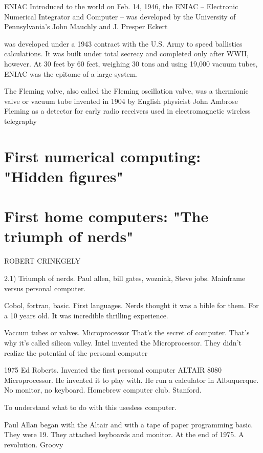   ENIAC Introduced to the world on Feb. 14, 1946, the ENIAC -- Electronic Numerical Integrator and Computer -- was developed by the 
  University 
  of Pennsylvania's John Mauchly and J. Presper Eckert 
  
  was developed under a 1943 contract with the U.S. Army to speed ballistics calculations. It was built under total secrecy and completed 
  only 
  after WWII, however. At 30 feet by 60 feet, weighing 30 tons and using 19,000 vacuum tubes, ENIAC was the epitome of a large system.
  
  The Fleming valve, also called the Fleming oscillation valve, was a thermionic valve or vacuum tube invented in 1904 by English physicist 
  John Ambrose Fleming as a detector for early radio receivers used in electromagnetic wireless telegraphy
  
  \section{First numerical computing: "Hidden figures"}
 
 
  \section{First home computers: "The triumph of nerds"}
  ROBERT CRINKGELY
  
  2.1) Triumph of nerds. Paul allen, bill gates, wozniak, Steve jobs. 
  Mainframe versus personal computer. 
  
  Cobol, fortran, basic. First languages. 
  Nerds thought it was a bible for them. For a 10 years old. It was incredible thrilling experience. 
  
  Vaccum tubes or valves. Microprocessor That's the secret of computer. That's why it's called silicon valley. Intel invented the 
  Microprocessor. 
  They didn't realize the potential of the personal computer
  
  
  
  
  1975 Ed Roberts. Invented the first personal computer ALTAIR 8080 Microprocessor. He invented it to play with. He run a calculator in 
  Albuquerque. No monitor, no keyboard. Homebrew computer club. Stanford. 
  
  To understand what to do with this usesless computer. 
  
  Paul Allan began with the Altair and with a tape of paper programming basic. They were 19. They attached keyboards and monitor. At the end 
  of 1975. A revolution. Groovy
  
